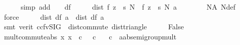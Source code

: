 \begin{isabellebody}
\ \ \ \ \isamarkupfalse%
\ {\isacharparenleft}{\kern0pt}simp\ add{\isacharcolon}{\kern0pt}\ {\isacartoucheopen}{}\ {\isacharless}{\kern0pt}\ {\isasymdelta}{\isacartoucheclose}\ df{\isacharparenright}{\kern0pt}\isanewline
\ \ \isamarkupfalse%
\ \isamarkupfalse%
\ {\isachardoublequoteopen}dist\ {\isacharparenleft}{\kern0pt}{\isacharparenleft}{\kern0pt}f\ {\isacharparenleft}{\kern0pt}z\ {\isacharplus}{\kern0pt}\ s\ N{\isacharparenright}{\kern0pt}\ {\isacharminus}{\kern0pt}\ f\ z{\isacharparenright}{\kern0pt}\ {\isacharslash}{\kern0pt}\ s\ N{\isacharparenright}{\kern0pt}\ a\ {\isacharless}{\kern0pt}\ {\isasymdelta}{\isachardoublequoteclose}\isanewline
\ \ \ \ \isamarkupfalse%
\ NA\ N{\isacharunderscore}{\kern0pt}def\ {\isacartoucheopen}{}\ {\isacharless}{\kern0pt}\ {\isasymdelta}{\isacartoucheclose}\ \isamarkupfalse%
\ force\isanewline
\ \ \isamarkupfalse%
\ \isamarkupfalse%
\ {\isachardoublequoteopen}dist\ df\ a\ {\isacharless}{\kern0pt}\ dist\ df\ a{\isachardoublequoteclose}\isanewline
\ \ \ \ \isamarkupfalse%
\ {\isacharparenleft}{\kern0pt}smt\ {\isacharparenleft}{\kern0pt}verit{\isacharcomma}{\kern0pt}\ ccfv{\isacharunderscore}{\kern0pt}SIG{\isacharparenright}{\kern0pt}\ {\isasymdelta}\ dist{\isacharunderscore}{\kern0pt}commute\ dist{\isacharunderscore}{\kern0pt}triangle{\isacharparenright}{\kern0pt}\isanewline
\ \ \isamarkupfalse%
\ \isamarkupfalse%
\ False\ \isacommand{{\isachardot}{\kern0pt}{\isachardot}{\kern0pt}}\isamarkupfalse%
\isanewline
{}\isamarkupfalse%
%
\endisatagproof
{\isafoldproof}%
%
\isadelimproof
\isanewline
%
\endisadelimproof
\isanewline
{}\isamarkupfalse%
\ mult{\isacharunderscore}{\kern0pt}commute{\isacharunderscore}{\kern0pt}abs{\isacharcolon}{\kern0pt}\ {\isachardoublequoteopen}{\isacharparenleft}{\kern0pt}{\isasymlambda}x{\isachardot}{\kern0pt}\ x\ {\isacharasterisk}{\kern0pt}\ c{\isacharparenright}{\kern0pt}\ {\isacharequal}{\kern0pt}\ {\isacharparenleft}{\kern0pt}{\isacharasterisk}{\kern0pt}{\isacharparenright}{\kern0pt}\ c{\isachardoublequoteclose}\isanewline
\ \ \ c\ {\isacharcolon}{\kern0pt}{\isacharcolon}{\kern0pt}\ {\isachardoublequoteopen}{\isacharprime}{\kern0pt}a{\isacharcolon}{\kern0pt}{\isacharcolon}{\kern0pt}ab{\isacharunderscore}{\kern0pt}semigroup{\isacharunderscore}{\kern0pt}mult{\isachardoublequoteclose}\isanewline
%
\isadelimproof
\ \ %
\endisadelimproof
%
\isatagproof
{}\isamarkupfalse%

\end{isabellebody}
